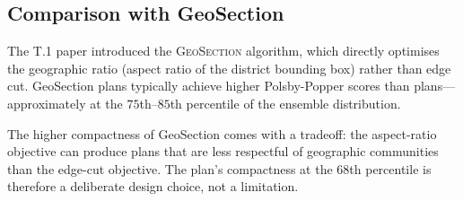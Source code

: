 \subsection{Comparison with GeoSection}

The T.1 paper \citep{dellaLibera2026b8} introduced the \textsc{GeoSection}
algorithm, which directly optimises the geographic ratio (aspect ratio of
the district bounding box) rather than edge cut.  GeoSection plans
typically achieve higher Polsby-Popper scores than \ar{} plans---approximately
at the $75$th--$85$th percentile of the ensemble distribution.

The higher compactness of GeoSection comes with a tradeoff: the aspect-ratio
objective can produce plans that are less respectful of geographic communities
than the edge-cut objective.  The \ar{} plan's compactness at the $68$th
percentile is therefore a deliberate design choice, not a limitation.
